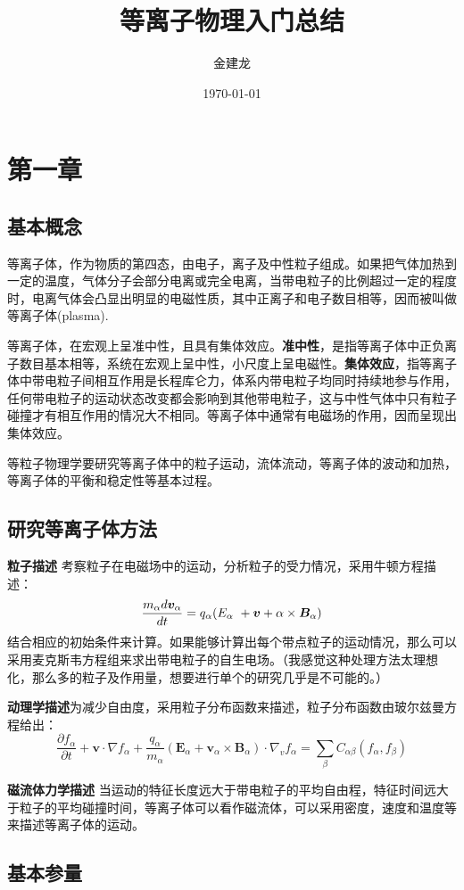 \documentclass[UTF8]{ctexart}
\title{等离子物理入门总结}
\author{金建龙}
\date{\today}
\begin{document}
\maketitle
\section{第一章}
\subsection{基本概念}
等离子体，作为物质的第四态，由电子，离子及中性粒子组成。如果把气体加热到一定的温度，气体分子会部分电离或完全电离，当带电粒子的比例超过一定的程度时，电离气体会凸显出明显的电磁性质，其中正离子和电子数目相等，因而被叫做等离子体(plasma).

等离子体，在宏观上呈准中性，且具有集体效应。\textbf{准中性}，是指等离子体中正负离子数目基本相等，系统在宏观上呈中性，小尺度上呈电磁性。\textbf{集体效应}，指等离子体中带电粒子间相互作用是长程库仑力，体系内带电粒子均同时持续地参与作用，任何带电粒子的运动状态改变都会影响到其他带电粒子，这与中性气体中只有粒子碰撞才有相互作用的情况大不相同。等离子体中通常有电磁场的作用，因而呈现出集体效应。

等粒子物理学要研究等离子体中的粒子运动，流体流动，等离子体的波动和加热，等离子体的平衡和稳定性等基本过程。

\subsection{研究等离子体方法}
\textbf{粒子描述}
考察粒子在电磁场中的运动，分析粒子的受力情况，采用牛顿方程描述：
$$ \frac{m_\alpha d \hm{v}_\alpha}{dt}  = q_\alpha (E_\alpha \ +\hm{v}+\alpha \times \hm{B}_\alpha) $$
结合相应的初始条件来计算。如果能够计算出每个带点粒子的运动情况，那么可以采用麦克斯韦方程组来求出带电粒子的自生电场。（我感觉这种处理方法太理想化，那么多的粒子及作用量，想要进行单个的研究几乎是不可能的。）

\textbf{动理学描述}为减少自由度，采用粒子分布函数来描述，粒子分布函数由玻尔兹曼方程给出：
$$ \frac{\partial f_\alpha}{\partial t} + \bm{v} \cdot \nabla f_\alpha + \frac{q_\alpha}{m_\alpha}(\bm E_\alpha + \bm v_\alpha \times \bm B_\alpha) \cdot \nabla _v f_\alpha = \sum_\beta C_{\alpha \beta}(f_\alpha, f_\beta) $$

\textbf{磁流体力学描述} 当运动的特征长度远大于带电粒子的平均自由程，特征时间远大于粒子的平均碰撞时间，等离子体可以看作磁流体，可以采用密度，速度和温度等来描述等离子体的运动。

\subsection{基本参量}
\end{document}
